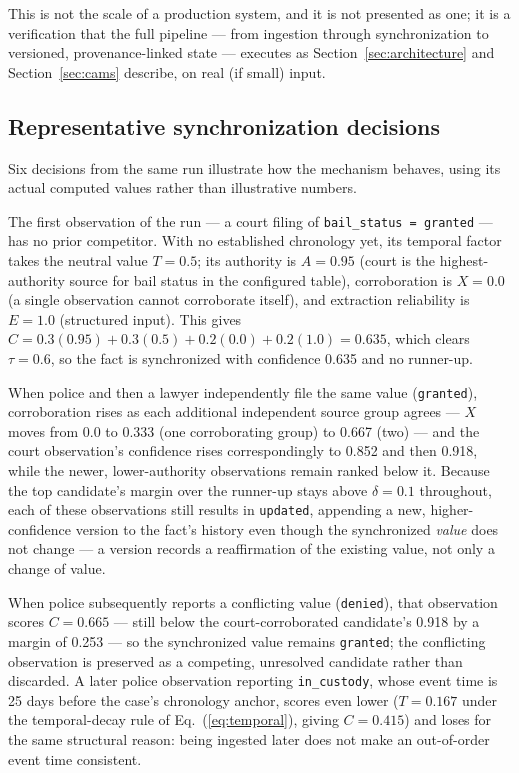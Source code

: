 \documentclass[conference]{IEEEtran}
\begin{document}
This is not the scale of a production system, and it is not presented as
one; it is a verification that the full pipeline --- from ingestion through
synchronization to versioned, provenance-linked state --- executes as
Section~\ref{sec:architecture} and Section~\ref{sec:cams} describe, on real
(if small) input.

\subsection{Representative synchronization decisions}

Six decisions from the same run illustrate how the mechanism behaves,
using its actual computed values rather than illustrative numbers.

The first observation of the run --- a court filing of
\texttt{bail\_status = granted} --- has no prior competitor. With no
established chronology yet, its temporal factor takes the neutral value
$T=0.5$; its authority is $A=0.95$ (court is the highest-authority source
for bail status in the configured table), corroboration is $X=0.0$ (a
single observation cannot corroborate itself), and extraction reliability
is $E=1.0$ (structured input). This gives $C = 0.3(0.95) + 0.3(0.5) +
0.2(0.0) + 0.2(1.0) = 0.635$, which clears $\tau = 0.6$, so the fact is
synchronized with confidence 0.635 and no runner-up.

When police and then a lawyer independently file the same value
(\texttt{granted}), corroboration rises as each additional independent
source group agrees --- $X$ moves from 0.0 to 0.333 (one corroborating
group) to 0.667 (two) --- and the court observation's confidence rises
correspondingly to 0.852 and then 0.918, while the newer, lower-authority
observations remain ranked below it. Because the top candidate's margin
over the runner-up stays above $\delta=0.1$ throughout, each of these
observations still results in \texttt{updated}, appending a new,
higher-confidence version to the fact's history even though the
synchronized \emph{value} does not change --- a version records a
reaffirmation of the existing value, not only a change of value.

When police subsequently reports a conflicting value (\texttt{denied}),
that observation scores $C=0.665$ --- still below the court-corroborated
candidate's 0.918 by a margin of 0.253 --- so the synchronized value
remains \texttt{granted}; the conflicting observation is preserved as a
competing, unresolved candidate rather than discarded. A later police
observation reporting \texttt{in\_custody}, whose event time is 25 days
before the case's chronology anchor, scores even lower ($T=0.167$ under the
temporal-decay rule of Eq.~(\ref{eq:temporal}), giving $C=0.415$) and loses
for the same structural reason: being ingested later does not make an
out-of-order event time consistent.
\end{document}
